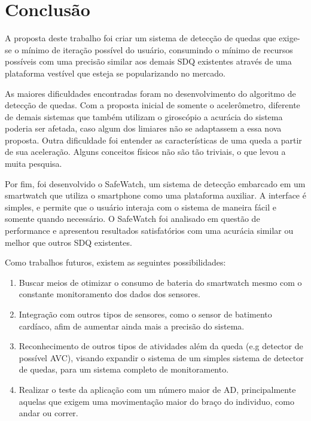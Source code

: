 \chapter{Conclusão}
\label{cap:conclusão}

A proposta deste trabalho foi criar um sistema de detecção de quedas que exige-se o mínimo de iteração possível do usuário, consumindo o mínimo de recursos possíveis com uma precisão similar aos demais \ac{SDQ} existentes através de uma plataforma vestível que esteja se popularizando no mercado. 

As maiores dificuldades encontradas foram no desenvolvimento do algoritmo de detecção de quedas. Com a proposta inicial de somente o acelerômetro, diferente de demais sistemas que também utilizam o giroscópio a acurácia do sistema poderia ser afetada, caso algum dos limiares não se adaptassem a essa nova proposta. Outra dificuldade foi entender as características de uma queda a partir de sua aceleração. Alguns conceitos físicos não são tão triviais, o que levou a muita pesquisa.    

Por fim, foi desenvolvido o SafeWatch, um sistema de detecção embarcado em um smartwatch que utiliza o smartphone como uma plataforma auxiliar. A interface é simples, e permite que o usuário interaja com o sistema de maneira fácil e somente quando necessário. O SafeWatch foi analisado em questão de performance e apresentou resultados satisfatórios com uma acurácia similar ou melhor que outros \ac{SDQ} existentes.

Como trabalhos futuros, existem as seguintes possibilidades:

	\begin{enumerate}
		\item Buscar meios de otimizar o consumo de bateria do smartwatch mesmo com o constante monitoramento dos dados dos sensores.
		\item Integração com outros tipos de sensores, como o sensor de batimento cardíaco, afim de aumentar ainda mais a precisão do sistema.
		\item Reconhecimento de outros tipos de atividades além da queda (e.g detector de possível AVC),  visando expandir o sistema de um simples sistema de detector de quedas, para um sistema completo de monitoramento. 
		\item Realizar o teste da aplicação com um número maior de \ac{AD}, principalmente aquelas que exigem uma movimentação maior do braço do individuo, como andar ou correr. 
 
	\end{enumerate}



